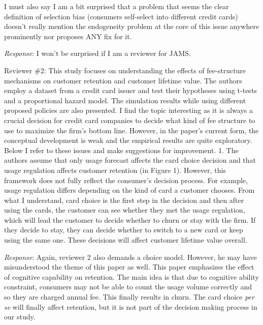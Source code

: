 \documentclass[titlepage,12pt,letterpaper]{article}
\numberwithin{equation}{section}
\begin{document}
  I must also say I am a bit surprised that a problem that seems the clear definition of selection bias (consumers self-select into different credit cards) doesn't really mention the endogeneity problem at the core of this issue anywhere prominently nor proposes ANY fix for it.

\emph{Response}: I won't be surprised if I am a reviewer for JAMS. 

Reviewer \#2: This study focuses on understanding the effects of fee-structure mechanisms on customer retention and customer lifetime value. The authors employ a dataset from a credit card issuer and test their hypotheses using t-tests and a proportional hazard model. The simulation results while using different proposed policies are also presented. I find the topic interesting as it is always a crucial decision for credit card companies to decide what kind of fee structure to use to maximize the firm's bottom line. However, in the paper's current form, the conceptual development is weak and the empirical results are quite exploratory. Below I refer to these issues and make suggestions for improvement.
1. 	The authors assume that only usage forecast affects the card choice decision and that usage regulation affects customer retention (in Figure 1). However, this framework does not fully reflect the consumer's decision process. For example, usage regulation differs depending on the kind of card a customer chooses. From what I understand, card choice is the first step in the decision and then after using the cards, the customer can see whether they met the usage regulation, which will lead the customer to decide whether to churn or stay with the firm. If they decide to stay, they can decide whether to switch to a new card or keep using the same one. These decisions will affect customer lifetime value overall.

\emph{Response}: Again, reviewer 2 also demands a choice model. However, he may have misunderstood the theme of this paper as well. This paper emphasizes the effect of cognitive capability on retention. The main idea is that due to cognitive ability constraint, consumers may not be able to count the usage volume correctly and so they are charged annual fee. This finally results in churn. The card choice \emph{per se} will finally affect retention, but it is not part of the decision making process in our study. 
\end{document}
